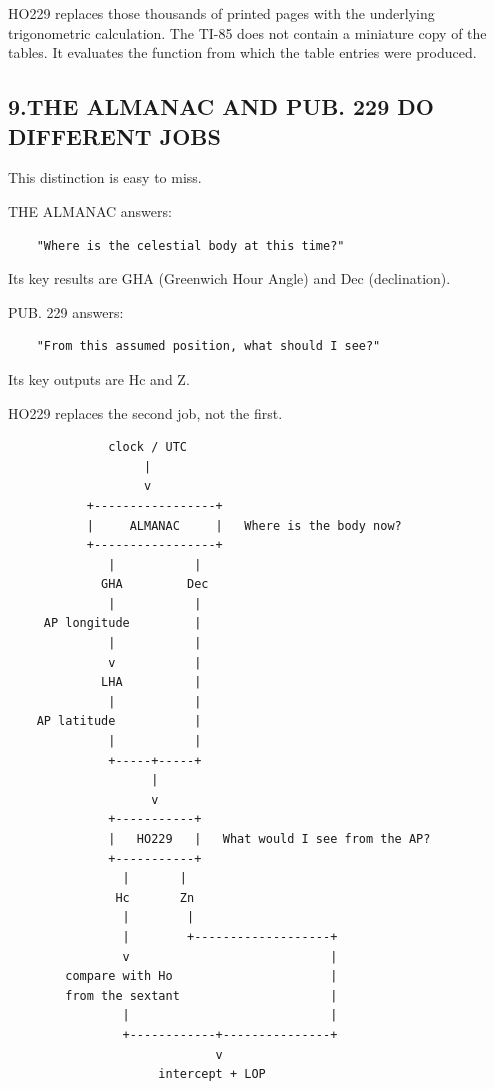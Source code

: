 \documentclass[11pt]{article}
\begin{document}
HO229 replaces those thousands of printed pages with the underlying trigonometric calculation. The TI-85 does not contain a miniature copy of the tables. It evaluates the function from which the table entries were produced.

\subsection*{9.\quad THE ALMANAC AND PUB. 229 DO DIFFERENT JOBS}

This distinction is easy to miss.

THE ALMANAC answers:

\begin{verbatim}
    "Where is the celestial body at this time?"
\end{verbatim}

Its key results are GHA (Greenwich Hour Angle) and Dec (declination).

PUB. 229 answers:

\begin{verbatim}
    "From this assumed position, what should I see?"
\end{verbatim}

Its key outputs are Hc and Z.

HO229 replaces the second job, not the first.

\begin{verbatim}
              clock / UTC
                   |
                   v
           +-----------------+
           |     ALMANAC     |   Where is the body now?
           +-----------------+
              |           |
             GHA         Dec
              |           |
     AP longitude         |
              |           |
              v           |
             LHA          |
              |           |
    AP latitude           |
              |           |
              +-----+-----+
                    |
                    v
              +-----------+
              |   HO229   |   What would I see from the AP?
              +-----------+
                |       |
               Hc       Zn
                |        |
                |        +-------------------+
                v                            |
        compare with Ho                      |
        from the sextant                     |
                |                            |
                +------------+---------------+
                             v
                     intercept + LOP
\end{verbatim}
\end{document}
